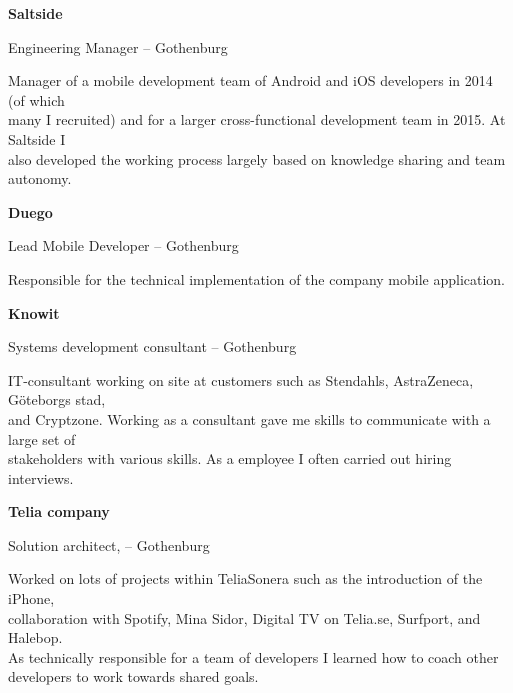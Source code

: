 \documentclass[letterpaper,MMMyyyy,nonstopmode]{simpleresumecv}
\begin{document}
\begin{Body}
\newpage

\BigGap
\Entry
\textbf{Saltside}

\Gap
\BulletItem
Engineering Manager
\hfill
{} --
\newline
Gothenburg
\begin{Detail}
\SubBulletItem
Manager of a mobile development team of Android and iOS developers in 2014 (of which\\many I recruited) and for a larger cross-functional development team in 2015. At Saltside I\\also developed the working process largely based on knowledge sharing and team autonomy.
\end{Detail}

\BigGap
\Entry
\textbf{Duego}

\Gap
\BulletItem
Lead Mobile Developer
\hfill
{} --
\newline
Gothenburg
\begin{Detail}
\SubBulletItem
Responsible for the technical implementation of the company mobile application.
\end{Detail}

\BigGap
\Entry
\textbf{Knowit}

\Gap
\BulletItem
Systems development consultant
\hfill
{} --
\newline
Gothenburg
\begin{Detail}
\SubBulletItem
IT-consultant working on site at customers such as Stendahls, AstraZeneca, Göteborgs stad,\\and Cryptzone. Working as a consultant gave me skills to communicate with a large set of\\stakeholders with various skills. As a employee I often carried out hiring interviews.
\end{Detail}

\BigGap
\Entry
\textbf{Telia company}

\Gap
\BulletItem
Solution architect,
\hfill
{} --
\newline
Gothenburg
\begin{Detail}
\SubBulletItem
Worked on lots of projects within TeliaSonera such as the introduction of the iPhone,\\collaboration with Spotify, Mina Sidor, Digital TV on Telia.se, Surfport, and Halebop.\\As technically responsible for a team of developers I learned how to coach other\\developers to work towards shared goals.
\end{Detail}


\end{Body}
\end{document}

